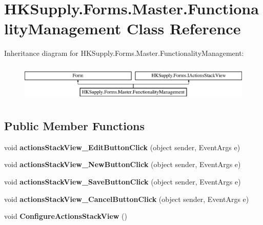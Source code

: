 \hypertarget{class_h_k_supply_1_1_forms_1_1_master_1_1_functionality_management}{}\section{H\+K\+Supply.\+Forms.\+Master.\+Functionality\+Management Class Reference}
\label{class_h_k_supply_1_1_forms_1_1_master_1_1_functionality_management}
Inheritance diagram for H\+K\+Supply.\+Forms.\+Master.\+Functionality\+Management\+:\begin{figure}[H]
\begin{center}
\leavevmode
\includegraphics[height=1.830065cm]{class_h_k_supply_1_1_forms_1_1_master_1_1_functionality_management}
\end{center}
\end{figure}
\subsection*{Public Member Functions}
\begin{DoxyCompactItemize}
\item 
\mbox{\label{class_h_k_supply_1_1_forms_1_1_master_1_1_functionality_management_a3d72cc9c48dd79d936535dbb386ca304}} 
void {\bfseries actions\+Stack\+View\+\_\+\+Edit\+Button\+Click} (object sender, Event\+Args e)
\item 
\mbox{\label{class_h_k_supply_1_1_forms_1_1_master_1_1_functionality_management_a124bbeebef7a1f06573a032342571c8f}} 
void {\bfseries actions\+Stack\+View\+\_\+\+New\+Button\+Click} (object sender, Event\+Args e)
\item 
\mbox{\label{class_h_k_supply_1_1_forms_1_1_master_1_1_functionality_management_a775ec1a63caa9faf229f704d14bd11a5}} 
void {\bfseries actions\+Stack\+View\+\_\+\+Save\+Button\+Click} (object sender, Event\+Args e)
\item 
\mbox{\label{class_h_k_supply_1_1_forms_1_1_master_1_1_functionality_management_a7bcf668b3f862d8ee0c60ef08e2075ff}} 
void {\bfseries actions\+Stack\+View\+\_\+\+Cancel\+Button\+Click} (object sender, Event\+Args e)
\item 
\mbox{\label{class_h_k_supply_1_1_forms_1_1_master_1_1_functionality_management_a5c2909260f97b980620f3a81bf9aaa5a}} 
void {\bfseries Configure\+Actions\+Stack\+View} ()
\end{DoxyCompactItemize}
